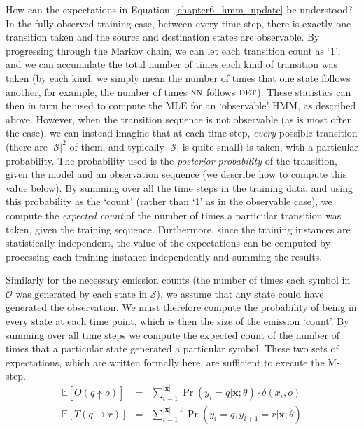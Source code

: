 How can the expectations in Equation~\ref{chapter6_hmm_update} be
understood?  In the fully observed training case, between every time
step, there is exactly one transition taken and the source and
destination states are observable.  By progressing through the Markov
chain, we can let each transition count as `1', and we can accumulate
the total number of times each kind of transition was taken (by each
kind, we simply mean the number of times that one state follows
another, for example, the number of times $\textsc{nn}$ follows
$\textsc{det}$).  These statistics can then in turn be used to compute
the MLE for an `observable' HMM, as described above.  However, when
the transition sequence is not observable (as is most often the case),
we can instead imagine that at each time step, \emph{every} possible
transition (there are $|\mathcal{S}|^2$ of them, and typically
$|\mathcal{S}|$ is quite small) is taken, with a particular
probability.  The probability used is the \emph{posterior probability}
of the transition, given the model and an observation sequence (we
describe how to compute this value below).  By summing over all the
time steps in the training data, and using this probability as the
`count' (rather than `1' as in the observable case), we compute the
\emph{expected count} of the number of times a particular transition
was taken, given the training sequence.  Furthermore, since the
training instances are statistically independent, the value of the
expectations can be computed by processing each training instance
independently and summing the results.

Similarly for the necessary emission counts (the number of times each
symbol in $\mathcal{O}$ was generated by each state in $\mathcal{S}$),
we assume that any state could have generated the observation.  We
must therefore compute the probability of being in every state at each
time point, which is then the size of the emission `count'.  By
summing over all time steps we compute the expected count of the
number of times that a particular state generated a particular symbol.
These two sets of expectations, which are written formally here, are
sufficient to execute the M-step.
\begin{eqnarray}
\label{eq:chapter6_ex1} \mathbb{E}[O(q \uparrow o)]& =& \sum_{i=1}^{|\textbf{x}|} \Pr(y_i = q | \textbf{x}; \theta) \cdot \delta(x_i,o) \\
\label{eq:chapter6_ex1a} \mathbb{E}[T(q \rightarrow r)] & = & \sum_{i=1}^{|\textbf{x}|-1} \Pr(y_i = q , y_{i+1} = r | \textbf{x}; \theta)
\end{eqnarray}

